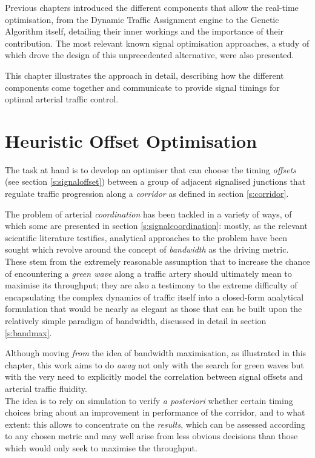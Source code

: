 Previous chapters introduced the different components that allow the real-time optimisation, from the Dynamic Traffic Assignment engine to the Genetic Algorithm itself, detailing their inner workings and the importance of their contribution. The most relevant known signal optimisation approaches, a study of which drove the design of this unprecedented alternative, were also presented.

This chapter illustrates the approach in detail, describing how the different components come together and communicate to provide signal timings for optimal arterial traffic control.


\section{Heuristic Offset Optimisation}
The task at hand is to develop an optimiser that can choose the timing \emph{offsets} (see section \ref{s:signaloffset}) between a group of adjacent signalised junctions that regulate traffic progression along a \emph{corridor} as defined in section \ref{s:corridor}.

The problem of arterial \emph{coordination} has been tackled in a variety of ways, of which some are presented in section \ref{s:signalcoordination}: mostly, as the relevant scientific literature testifies, analytical approaches to the problem have been sought which revolve around the concept of \emph{bandwidth} as the driving metric. These stem  from the extremely reasonable assumption that to increase the chance of encountering a \emph{green wave} along a traffic artery should ultimately mean to maximise its throughput; they are also a testimony to the extreme difficulty of encapsulating the complex dynamics of traffic itself into a closed-form analytical formulation that would be nearly as elegant as those that can be built upon the relatively simple paradigm of bandwidth, discussed in detail in section \ref{s:bandmax}.

Although moving \emph{from} the idea of bandwidth maximisation, as illustrated in this chapter, this work aims to do \emph{away} not only with the search for green waves but with the very need to explicitly model the correlation between signal offsets and arterial traffic fluidity. \\
The idea is to rely on simulation to verify \emph{a posteriori} whether certain timing choices bring about an improvement in performance of the corridor, and to what extent: this allows to concentrate on the \emph{results}, which can be assessed according to any chosen metric and may well arise from less obvious decisions than those which would only seek to maximise the throughput.

